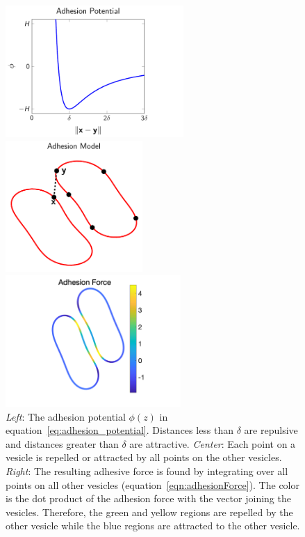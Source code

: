 \documentclass[prf,superscriptaddress,showkeys]{revtex4-1}
\begin{document}
%
\begin{figure}[htp]
  \begin{minipage}{0.31\textwidth}
    \centering
    \includegraphics[height=5cm,trim={0cm 0cm 2cm 0cm},clip]{figs/adhesionPotential.pdf}
  \end{minipage}
  \hfill
  \begin{minipage}{0.31\textwidth}
    \centering
    \includegraphics[height=5cm]{figs/configCartoon.pdf}
  \end{minipage}
  \hfill
  \begin{minipage}{0.31\textwidth}
    \centering
    \includegraphics[height=5cm,trim={3cm 0cm 2cm 0cm},clip]{figs/Adhesion_Force.png}
  \end{minipage}
  \caption{\label{fig:adhesionModel} {\em Left}: The adhesion potential
  $\phi(z)$ in equation~\eqref{eq:adhesion_potential}.  Distances less
  than $\delta$ are repulsive and distances greater than $\delta$ are
  attractive.  {\em Center}: Each point on a vesicle is repelled or
  attracted by all points on the other vesicles.  {\em Right}: The
  resulting adhesive force is found by integrating over all points on
  all other vesicles (equation~\eqref{eqn:adhesionForce}).  The color is
  the dot product of the adhesion force with the vector joining the
  vesicles.  Therefore, the green and yellow regions are repelled by the
  other vesicle while the blue regions are attracted to the other
  vesicle.}
\end{figure}
\end{document}
